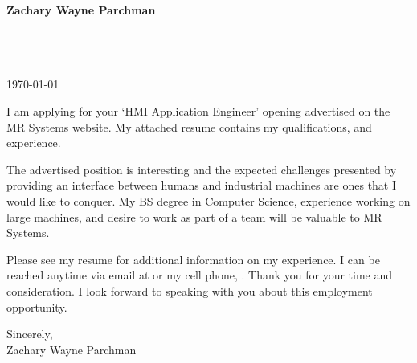 \documentclass[10pt]{article}
\begin{document}

\begin{center}
\begin{Huge}
    \bf{Zachary Wayne Parchman}
\end{Huge}
\end{center}
\vspace{10mm}

\setlength{\parskip}{5mm}

\noindent
\address{}\\
\phone{}\\
\email{}\\

\noindent
\today{}


I am applying for your `HMI Application Engineer' opening
advertised on the MR Systems website. 
My attached resume contains my qualifications, and experience.

The advertised position is interesting and the expected challenges presented by
providing an interface between humans and industrial machines are ones that I
would like to conquer. My BS degree in Computer Science, experience
working on large machines, and desire to work as part of a team will be
valuable to MR Systems.

Please see my resume for additional information on my experience.  I can be
reached anytime via email at \email{} or my cell phone,
\phone{}. Thank you for your time and consideration. I look forward to
speaking with you about this employment opportunity.

\noindent
Sincerely,\\
\hspace*{5mm}Zachary Wayne Parchman
\end{document}
